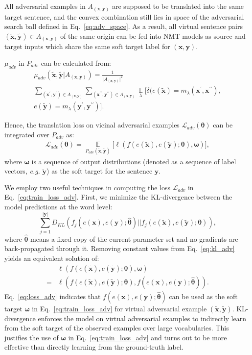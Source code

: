 \documentclass[11pt,a4paper]{article}
\def\bx{\mathbf{x}} \def\bxp{\mathbf{x}^{\prime}} \def\bxpp{\mathbf{x}^{\prime\prime}} \def\tbx{\tilde{\mathbf{x}}} \def\hbx{\hat{\mathbf{x}}} \def\ex{e(\mathbf{x})}
\def\tex{e({\tilde{\mathbf{x}}})}
\def\by{\mathbf{y}} \def\byp{\mathbf{y}^{\prime}} \def\bypp{\mathbf{y}^{\prime\prime}} \def\tby{\tilde{\mathbf{y}}} \def\hby{\hat{\mathbf{y}}} \def\ey{e(\mathbf{y})}
\def\tey{e({\tilde{\mathbf{y}}})}
\def\Axy{A_{(\mathbf{x}, \mathbf{y})}}
\newcommand{\eg}{\emph{e.g. }} \newcommand{\Eg}{\emph{E.g}}
\begin{document}
All adversarial examples in $A_{(\bx, \by)}$ are supposed to be translated into the same target sentence, and the convex combination still lies in space of the adversarial search ball defined in Eq.~\eqref{eq:adv_space}. As a result, all virtual sentence pairs $(\tbx, \tby) \in A_{(\bx, \by)}$ of the same origin can be fed into NMT models as source and target inputs which share the same soft target label for $(\bx, \by)$.

$\mu_{adv}$ in $P_{adv}$ can be calculated from:
\begin{align}
\mu_{adv} (\tbx, \tby | \Axy)=
\frac{1}{\vert \Axy \vert ^2} \quad \nonumber \\
\!\!\!\!\!\sum_{(\bxp, \byp) \in \Axy}\!\! \sum_{(\bxpp, \bypp) \in \Axy}   
\mathop{\mathbb{E}}\limits_{\lambda} [\delta(\tex=m_{\lambda}(\bxp, \bxpp), \nonumber \\
\tey=m_{\lambda}(\byp, \bypp)]. \label{mu_adv}
\end{align}

Hence, the translation loss on vicinal adversarial examples $\mathcal{L}_{adv}(\bm{\theta})$ can be integrated over $P_{adv}$ as:
\begin{eqnarray}
\mathcal{L}_{adv}(\bm{\theta})\!=\!\!\! \mathop{\mathbb{E}}\limits_{P_{adv}{(\tbx,\tby)}} \lbrack \ell(f(\tex, \tey;\bm{\theta}), \bm{\omega}) \rbrack,
\label{eq:train_loss_adv}
\end{eqnarray}
where $\bm{\omega}$ is a sequence of output distributions (denoted as a sequence of label vectors, \eg $\ddot{\by}$) as the soft target for the sentence $\mathbf{y}$. 


We employ two useful techniques in computing the loss $\mathcal{L}_{adv}$ in Eq.~\eqref{eq:train_loss_adv}. First, we minimize the KL-divergence between the model predictions at the word level:
\begin{equation}
\sum_{j=1} ^{\vert \by \vert} D_{KL}(f_{j}(e(\bx), e(\by);\hat{\bm{\theta}}) || f_{j}(\tex, \tey ;\bm{\theta})), \label{eq:kl_adv}
\end{equation}
where $\hat{\bm{\theta}}$ means a fixed copy of the current parameter set and no gradients are back-propagated through it. Removing constant values from Eq.~\eqref{eq:kl_adv} yields an equivalent solution of:
\begin{align}
&\ell(f(\tex, \tey ;\bm{\theta}),\bm{\omega}) \nonumber \\
=&\ell(f(\tex, \tey ;\bm{\theta}),f(\ex, \ey;\hat{\bm{\theta}})).
\label{eq:loss_adv}
\end{align}
Eq.~\eqref{eq:loss_adv} indicates that $f(e(\bx), e(\by); \hat{\bm{\theta}})$ can be used as the soft target $\bm{\omega}$ in Eq.~\eqref{eq:train_loss_adv} for virtual adversarial example $(\tbx, \tby)$.
KL-divergence enforces the model on virtual adversarial examples to indirectly learn from the soft target of the observed examples over large vocabularies. This justifies the use of $\bm{\omega}$ in Eq.~\eqref{eq:train_loss_adv} and turns out to be more effective than directly learning from the ground-truth label.
\end{document}
